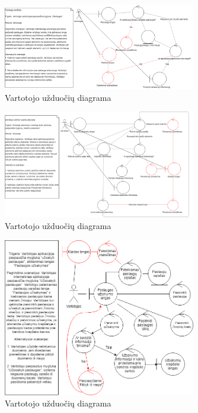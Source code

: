 \documentclass[oneside]{VUMIFPSkursinis}
\begin{document}
			\begin{figure}[h]
    				\centering
    				\includegraphics[width=0.75\textwidth]{rob4.png}
    				\caption{Vartotojo užduočių diagrama}
    				\label{fig:VartotojoUseCasel}
			\end{figure}

			\begin{figure}[h]
    				\centering
    				\includegraphics[width=0.75\textwidth]{rob5.png}
    				\caption{Vartotojo užduočių diagrama}
    				\label{fig:VartotojoUseCasel}
			\end{figure}

			\begin{figure}[h]
    				\centering
    				\includegraphics[width=0.75\textwidth]{rob6.png}
    				\caption{Vartotojo užduočių diagrama}
    				\label{fig:VartotojoUseCasel}
			\end{figure}
\end{document}
